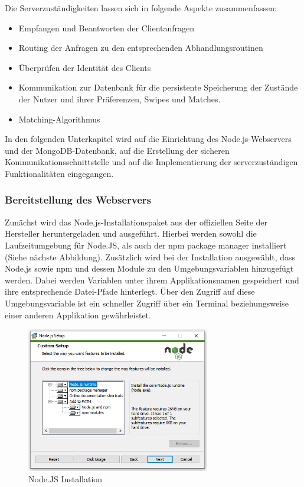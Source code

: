 Die Serverzuständigkeiten lassen sich in folgende Aspekte zusammenfassen:
\begin{itemize}
\item Empfangen und Beantworten der Clientanfragen
\item Routing der Anfragen zu den entsprechenden Abhandlungsroutinen
\item Überprüfen der Identität des Clients
\item Kommunikation zur Datenbank für die persistente Speicherung der Zustände der Nutzer und ihrer Präferenzen, Swipes und Matches.
\item Matching-Algorithmus
\end{itemize} 

\noindent
In den folgenden Unterkapitel wird auf die Einrichtung des Node.js-Webservers und der MongoDB-Datenbank, auf die Erstellung der sicheren Kommunikationsschnittstelle und auf die Implementierung der serverzuständigen Funktionalitäten eingegangen.

\subsubsection{Bereitstellung des Webservers}
Zunächst wird das Node.js-Installationspaket aus der offiziellen Seite der Hersteller heruntergeladen und ausgeführt. Hierbei werden sowohl die Laufzeitumgebung für Node.JS, als auch der npm package manager installiert (Siehe nächste Abbildung). 
Zusätzlich wird bei der Installation ausgewählt, dass Node.js sowie npm und dessen Module zu den Umgebungsvariablen hinzugefügt werden. Dabei werden Variablen unter ihrem Applikationsnamen gespeichert und ihre entsprechende Datei-Pfade hinterlegt.
Über den Zugriff auf diese Umgebungsvariable ist ein schneller Zugriff über ein Terminal beziehungsweise einer anderen Applikation gewährleistet.


\begin{figure}[tbt]
\centering
\includegraphics[width=8cm]{images/nodejs_install.png}
\caption{Node.JS Installation}
\label{fig:installation_nodejs}
\end{figure}

